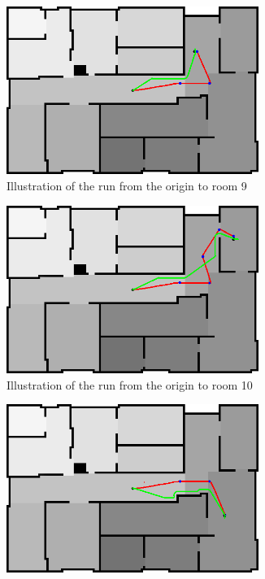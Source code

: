 \documentclass[../Head/Main.tex]{subfiles}
\begin{document}
\begin{figure}[H]
  \begin{subfigure}[b]{0.49\textwidth}
    \centering
    \includegraphics[width=0.9\textwidth]{Modelbased_vs_Sensorbased/brushfireAndBugTest9}
    \caption{Illustration of the run from the origin to room 9}
    \label{fig:Test9}
  \end{subfigure}
  \hfill
  \begin{subfigure}[b]{0.49\textwidth}
    \centering
    \includegraphics[width=0.9\textwidth]{Modelbased_vs_Sensorbased/brushfireAndBugTest10}
    \caption{Illustration of the run from the origin to room 10}
    \label{fig:Test10}
  \end{subfigure}
  \hfill
  \begin{subfigure}[b]{0.49\textwidth}
    \centering
    \includegraphics[width=0.9\textwidth]{Modelbased_vs_Sensorbased/brushfireAndBugTest11}

\end{subfigure}
\end{figure}
\end{document}
